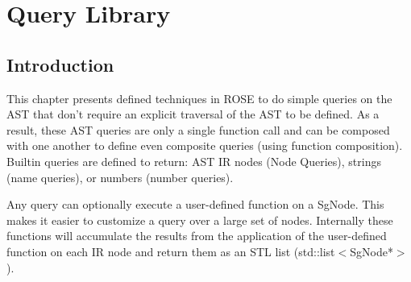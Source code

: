 \chapter{Query Library}

\label{QueryLibrary:QueryLibrary}



\section{Introduction}

   This chapter presents defined techniques in ROSE to do simple queries on the AST that
don't require an explicit traversal of the AST to be defined.  As a result, these AST
queries are only a single function call and can be composed with one another to define
even composite queries (using function composition).  Builtin queries are defined
to return: AST IR nodes (Node Queries), strings (name queries), or numbers (number 
queries).

Any query can optionally execute a user-defined function on a SgNode. This makes
it easier to customize a query over a large set of nodes.
Internally these functions will accumulate the results from the application 
of the user-defined function on each IR node and return them as an STL list
(std::list$<$SgNode*$>$).

